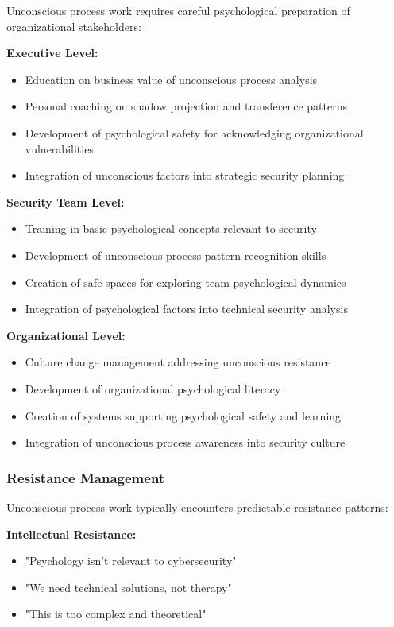 \documentclass[11pt,a4paper]{article}
\begin{document}
Unconscious process work requires careful psychological preparation of organizational stakeholders:

\textbf{Executive Level:}
\begin{itemize}
\item Education on business value of unconscious process analysis
\item Personal coaching on shadow projection and transference patterns
\item Development of psychological safety for acknowledging organizational vulnerabilities
\item Integration of unconscious factors into strategic security planning
\end{itemize}

\textbf{Security Team Level:}
\begin{itemize}
\item Training in basic psychological concepts relevant to security
\item Development of unconscious process pattern recognition skills
\item Creation of safe spaces for exploring team psychological dynamics
\item Integration of psychological factors into technical security analysis
\end{itemize}

\textbf{Organizational Level:}
\begin{itemize}
\item Culture change management addressing unconscious resistance
\item Development of organizational psychological literacy
\item Creation of systems supporting psychological safety and learning
\item Integration of unconscious process awareness into security culture
\end{itemize}

\subsubsection{Resistance Management}

Unconscious process work typically encounters predictable resistance patterns:

\textbf{Intellectual Resistance:}
\begin{itemize}
\item "Psychology isn't relevant to cybersecurity"
\item "We need technical solutions, not therapy"
\item "This is too complex and theoretical"
\end{itemize}
\end{document}
